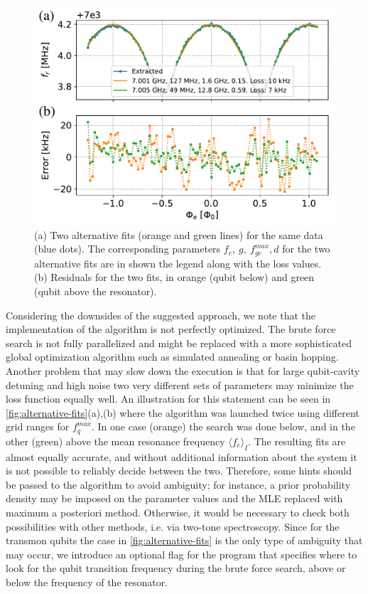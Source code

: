 \documentclass[%
 aip,
 amsmath,amssymb,
 reprint,%
]{revtex4-1}
\begin{document}
\begin{figure}[t]
	\centering
	\includegraphics[width=\linewidth]{alternative_fits}
	\caption{(a) Two alternative fits (orange and green lines) for the same data (blue dots). The corresponding parameters $f_c,\ g,\ f_{ge}^{max}, d$ for the two alternative fits are in shown the legend along with the loss values. (b) Residuals for the two fits, in orange (qubit below) and green (qubit above the resonator).}
	\label{fig:alternative-fits}
\end{figure}

Considering the downsides of the suggested approach, we note that the implementation of the algorithm is not perfectly optimized. The brute force search is not fully parallelized and might be replaced with a more sophisticated global optimization algorithm such as simulated annealing or basin hopping. Another problem that may slow down the execution is that for large qubit-cavity detuning and high noise two very different sets of parameters may minimize the loss function equally well. An illustration for this statement can be seen in \autoref{fig:alternative-fits}(a),(b) where the algorithm was launched twice using different grid ranges for $f_q^{max}$. In one case (orange) the search was done below, and in the other (green) above the mean resonance frequency $\langle f_c\rangle_{I}$. The resulting fits are almost equally accurate, and without additional information about the system it is not possible to reliably decide between the two. Therefore, some hints should be passed to the algorithm to avoid ambiguity; for instance, a prior probability density may be imposed on the parameter values and the MLE replaced with maximum a posteriori method. Otherwise, it would be necessary to check both possibilities with other methods, i.e. via two-tone spectroscopy. Since for the transmon qubits the case in \autoref{fig:alternative-fits} is the only type of ambiguity that may occur, we introduce an optional flag for the program that specifies where to look for the qubit transition frequency during the brute force search, above or below the frequency of the resonator.
\end{document}
